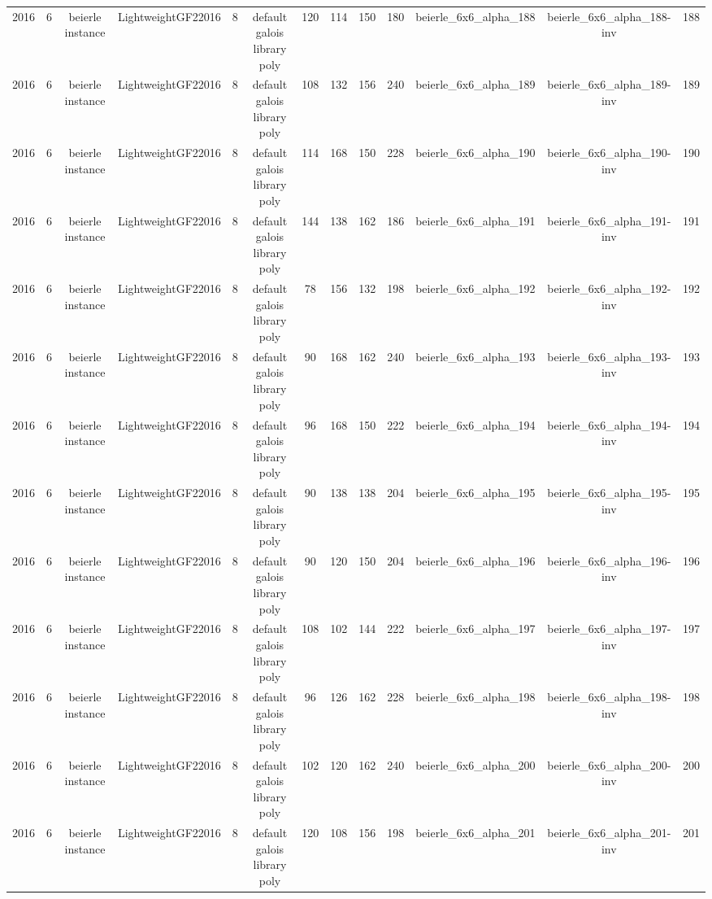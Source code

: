 \begin{tabular}{c c c c c c c c c c c c c}
2016 & 6 & beierle instance & LightweightGF22016 & 8 & default galois library poly & 120 & 114 & 150 & 180 & beierle_6x6_alpha_188 & beierle_6x6_alpha_188-inv & 188 \\
2016 & 6 & beierle instance & LightweightGF22016 & 8 & default galois library poly & 108 & 132 & 156 & 240 & beierle_6x6_alpha_189 & beierle_6x6_alpha_189-inv & 189 \\
2016 & 6 & beierle instance & LightweightGF22016 & 8 & default galois library poly & 114 & 168 & 150 & 228 & beierle_6x6_alpha_190 & beierle_6x6_alpha_190-inv & 190 \\
2016 & 6 & beierle instance & LightweightGF22016 & 8 & default galois library poly & 144 & 138 & 162 & 186 & beierle_6x6_alpha_191 & beierle_6x6_alpha_191-inv & 191 \\
2016 & 6 & beierle instance & LightweightGF22016 & 8 & default galois library poly & 78 & 156 & 132 & 198 & beierle_6x6_alpha_192 & beierle_6x6_alpha_192-inv & 192 \\
2016 & 6 & beierle instance & LightweightGF22016 & 8 & default galois library poly & 90 & 168 & 162 & 240 & beierle_6x6_alpha_193 & beierle_6x6_alpha_193-inv & 193 \\
2016 & 6 & beierle instance & LightweightGF22016 & 8 & default galois library poly & 96 & 168 & 150 & 222 & beierle_6x6_alpha_194 & beierle_6x6_alpha_194-inv & 194 \\
2016 & 6 & beierle instance & LightweightGF22016 & 8 & default galois library poly & 90 & 138 & 138 & 204 & beierle_6x6_alpha_195 & beierle_6x6_alpha_195-inv & 195 \\
2016 & 6 & beierle instance & LightweightGF22016 & 8 & default galois library poly & 90 & 120 & 150 & 204 & beierle_6x6_alpha_196 & beierle_6x6_alpha_196-inv & 196 \\
2016 & 6 & beierle instance & LightweightGF22016 & 8 & default galois library poly & 108 & 102 & 144 & 222 & beierle_6x6_alpha_197 & beierle_6x6_alpha_197-inv & 197 \\
2016 & 6 & beierle instance & LightweightGF22016 & 8 & default galois library poly & 96 & 126 & 162 & 228 & beierle_6x6_alpha_198 & beierle_6x6_alpha_198-inv & 198 \\
2016 & 6 & beierle instance & LightweightGF22016 & 8 & default galois library poly & 102 & 120 & 162 & 240 & beierle_6x6_alpha_200 & beierle_6x6_alpha_200-inv & 200 \\
2016 & 6 & beierle instance & LightweightGF22016 & 8 & default galois library poly & 120 & 108 & 156 & 198 & beierle_6x6_alpha_201 & beierle_6x6_alpha_201-inv & 201 \\

\end{tabular}
